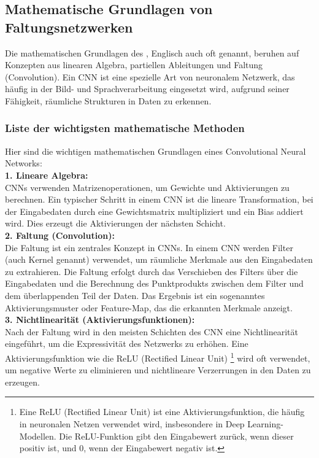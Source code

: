 \documentclass[12pt]{article}
\begin{document}
\subsection{Mathematische Grundlagen von Faltungsnetzwerken}
%
Die mathematischen Grundlagen des {\color{blue}{Faltungsnetzwerke}}, Englisch auch oft {\color{blue}{Convolutional Neural Networks (CNN)}} genannt, beruhen auf Konzepten aus linearen Algebra, partiellen Ableitungen und Faltung (Convolution). Ein CNN ist eine spezielle Art von neuronalem Netzwerk, das häufig in der Bild- und Sprachverarbeitung eingesetzt wird, aufgrund seiner Fähigkeit, räumliche Strukturen in Daten zu erkennen.
\subsubsection{Liste der wichtigsten mathematische Methoden}
Hier sind die wichtigen mathematischen Grundlagen eines Convolutional Neural Networks:\\
%
\textbf{1. Lineare Algebra:}\\
CNNs verwenden Matrizenoperationen, um Gewichte und Aktivierungen zu berechnen. Ein typischer Schritt in einem CNN ist die lineare Transformation, bei der Eingabedaten durch eine Gewichtsmatrix multipliziert und ein Bias addiert wird. Dies erzeugt die Aktivierungen der nächsten Schicht.\\[0.2cm]
\textbf{2. Faltung (Convolution):}\\
Die Faltung ist ein zentrales Konzept in CNNs. In einem CNN werden Filter (auch Kernel genannt) verwendet, um räumliche Merkmale aus den Eingabedaten zu extrahieren. Die Faltung erfolgt durch das Verschieben des Filters über die Eingabedaten und die Berechnung des Punktprodukts zwischen dem Filter und dem überlappenden Teil der Daten. Das Ergebnis ist ein sogenanntes Aktivierungsmuster oder Feature-Map, das die erkannten Merkmale anzeigt.\\[0.2cm]
\textbf{3. Nichtlinearität (Aktivierungsfunktionen):}\\
Nach der Faltung wird in den meisten Schichten des CNN eine Nichtlinearität eingeführt, um die Expressivität des Netzwerks zu erhöhen. Eine Aktivierungsfunktion wie die ReLU (Rectified Linear Unit) \footnote{Eine ReLU (Rectified Linear Unit) ist eine Aktivierungsfunktion, die häufig in neuronalen Netzen verwendet wird, insbesondere in Deep Learning-Modellen. Die ReLU-Funktion gibt den Eingabewert zurück, wenn dieser positiv ist, und 0, wenn der Eingabewert negativ ist.} wird oft verwendet, um negative Werte zu eliminieren und nichtlineare Verzerrungen in den Daten zu erzeugen.\\[0.2cm]
\end{document}
